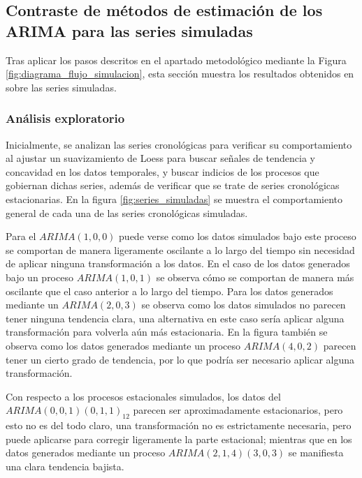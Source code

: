 \documentclass[
]{article}
\begin{document}
\subsection{Contraste de métodos de estimación de los ARIMA para las series simuladas}

Tras aplicar los pasos descritos en el apartado metodológico mediante la
Figura \ref{fig:diagrama_flujo_simulacion}, esta sección muestra los
resultados obtenidos en sobre las series simuladas.

\subsubsection{Análisis exploratorio}

Inicialmente, se analizan las series cronológicas para verificar su
comportamiento al ajustar un suavizamiento de Loess para buscar señales
de tendencia y concavidad en los datos temporales, y buscar indicios de
los procesos que gobiernan dichas series, además de verificar que se
trate de series cronológicas estacionarias. En la figura
\ref{fig:series_simuladas} se muestra el comportamiento general de cada
una de las series cronológicas simuladas.

Para el \(ARIMA(1,0,0)\) puede verse como los datos simulados bajo este
proceso se comportan de manera ligeramente oscilante a lo largo del
tiempo sin necesidad de aplicar ninguna transformación a los datos. En
el caso de los datos generados bajo un proceso \(ARIMA(1,0,1)\) se
observa cómo se comportan de manera más oscilante que el caso anterior a
lo largo del tiempo. Para los datos generados mediante un
\(ARIMA(2,0,3)\) se observa como los datos simulados no parecen tener
ninguna tendencia clara, una alternativa en este caso sería aplicar
alguna transformación para volverla aún más estacionaria. En la figura
también se observa como los datos generados mediante un proceso
\(ARIMA(4,0,2)\) parecen tener un cierto grado de tendencia, por lo que
podría ser necesario aplicar alguna transformación.

Con respecto a los procesos estacionales simulados, los datos del
\(ARIMA(0,0,1)(0,1,1)_{12}\) parecen ser aproximadamente estacionarios,
pero esto no es del todo claro, una transformación no es estrictamente
necesaria, pero puede aplicarse para corregir ligeramente la parte
estacional; mientras que en los datos generados mediante un proceso
\(ARIMA(2,1,4)(3,0,3)\) se manifiesta una clara tendencia bajista.
\end{document}
